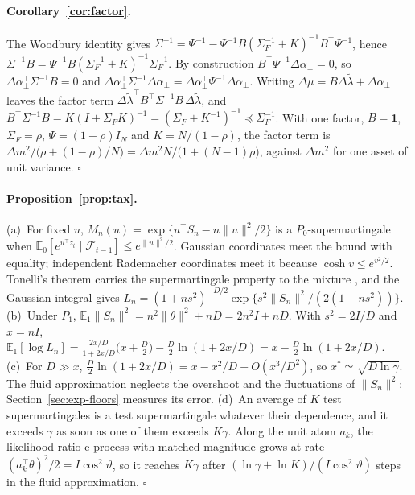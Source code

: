 \paragraph{Corollary~\ref{cor:factor}.}
The Woodbury identity gives $\Sigma^{-1}=\Psi^{-1}-\Psi^{-1}B(\Sigma_F^{-1}+K)^{-1}B^{\top}\Psi^{-1}$, hence $\Sigma^{-1}B=\Psi^{-1}B(\Sigma_F^{-1}+K)^{-1}\Sigma_F^{-1}$. By construction $B^{\top}\Psi^{-1}\Delta\alpha_\perp=0$, so $\Delta\alpha_\perp^{\top}\Sigma^{-1}B=0$ and $\Delta\alpha_\perp^{\top}\Sigma^{-1}\Delta\alpha_\perp=\Delta\alpha_\perp^{\top}\Psi^{-1}\Delta\alpha_\perp$. Writing $\Delta\mu=B\Delta\tilde\lambda+\Delta\alpha_\perp$ leaves the factor term $\Delta\tilde\lambda^{\top}B^{\top}\Sigma^{-1}B\,\Delta\tilde\lambda$, and $B^{\top}\Sigma^{-1}B=K(I+\Sigma_FK)^{-1}=(\Sigma_F+K^{-1})^{-1}\preceq\Sigma_F^{-1}$. With one factor, $B=\mathbf 1$, $\Sigma_F=\rho$, $\Psi=(1-\rho)I_N$ and $K=N/(1-\rho)$, the factor term is $\Delta m^2/\big(\rho+(1-\rho)/N\big)=\Delta m^2N/\big(1+(N-1)\rho\big)$, against $\Delta m^2$ for one asset of unit variance. \hfill$\square$

\paragraph{Proposition~\ref{prop:tax}.}
(a)~For fixed $u$, $M_n(u)=\exp\{u^{\top}S_n-n\|u\|^2/2\}$ is a $P_0$-supermartingale when $\mathbb{E}_0[e^{u^{\top}z_t}\mid\mathcal{F}_{t-1}]\le e^{\|u\|^2/2}$. Gaussian coordinates meet the bound with equality; independent Rademacher coordinates meet it because $\cosh v\le e^{v^2/2}$. Tonelli's theorem carries the supermartingale property to the mixture \citep{robbins_1970,howard_2020}, and the Gaussian integral gives $L_n=(1+ns^2)^{-D/2}\exp\{s^2\|S_n\|^2/(2(1+ns^2))\}$.
(b)~Under $P_1$, $\mathbb{E}_1\|S_n\|^2=n^2\|\theta\|^2+nD=2n^2I+nD$. With $s^2=2I/D$ and $x=nI$, $\mathbb{E}_1[\log L_n]=\frac{2x/D}{1+2x/D}\big(x+\tfrac D2\big)-\tfrac D2\ln(1+2x/D)=x-\tfrac D2\ln(1+2x/D)$.
(c)~For $D\gg x$, $\tfrac D2\ln(1+2x/D)=x-x^2/D+O(x^3/D^2)$, so $x^\ast\simeq\sqrt{D\ln\gamma}$. The fluid approximation neglects the overshoot and the fluctuations of $\|S_n\|^2$; Section~\ref{sec:exp-floors} measures its error.
(d)~An average of $K$ test supermartingales is a test supermartingale whatever their dependence, and it exceeds $\gamma$ as soon as one of them exceeds $K\gamma$. Along the unit atom $a_k$, the likelihood-ratio e-process with matched magnitude grows at rate $(a_k^{\top}\theta)^2/2=I\cos^2\vartheta$, so it reaches $K\gamma$ after $(\ln\gamma+\ln K)/(I\cos^2\vartheta)$ steps in the fluid approximation. \hfill$\square$

